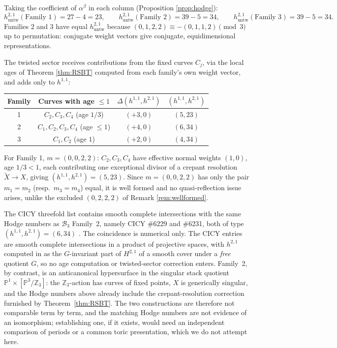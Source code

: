 \documentclass[11pt]{article}
\newcommand{\PP}{\mathbb{P}}
\newcommand{\ZZ}{\mathbb{Z}}
\begin{document}
	Taking the coefficient of $\alpha^\beta$ in each column (Proposition \ref{prop:hodge}):
	\[
	h^{2,1}_{\text{untw}}(\text{Family 1})=27-4=23,\qquad
	h^{2,1}_{\text{untw}}(\text{Family 2})=39-5=34,\qquad
	h^{2,1}_{\text{untw}}(\text{Family 3})=39-5=34.
	\]
	Families 2 and 3 have equal $h^{2,1}_{\text{untw}}$ because $(0,1,2,2)\equiv-(0,1,1,2)\pmod3$ up to permutation: conjugate weight vectors give conjugate, equidimensional representations.
	
	The twisted sector receives contributions from the fixed curves $C_j$, via the local ages of Theorem \ref{thm:RSBT} computed from each family's own weight vector, and adds only to $h^{1,1}$:
	
	\begin{center}
		\begin{tabular}{c|c|c|c}
			Family & Curves with age $\le1$ & $\Delta(h^{1,1},h^{2,1})$ & $(h^{1,1},h^{2,1})$ \\
			\hline
			1 & $C_2,C_3,C_4$ (age $1/3$) & $(+3,0)$ & $(5,23)$ \\
			2 & $C_1,C_2,C_3,C_4$ (age $\le1$) & $(+4,0)$ & $(6,34)$ \\
			3 & $C_1,C_2$ (age $1$) & $(+2,0)$ & $(4,34)$ \\
			\hline
		\end{tabular}
	\end{center}
	
	For Family 1, $m=(0,0,2,2)$: $C_2,C_3,C_4$ have effective normal weights $(1,0)$, age $1/3<1$, each contributing one exceptional divisor of a crepant resolution $\tilde X\to X$, giving $(h^{1,1},h^{2,1})=(5,23)$. Since $m=(0,0,2,2)$ has only the pair $m_1=m_2$ (resp.\ $m_3=m_4$) equal, it is well formed and no quasi-reflection issue arises, unlike the excluded $(0,2,2,2)$ of Remark \ref{rem:wellformed}.
	
	The CICY threefold list \cite{CandelasDale1988,Green1989,Braun2010} contains smooth complete intersections with the same Hodge numbers as $\mathcal B_3$ Family~2, namely CICY \#6229 and \#6231, both of type $(h^{1,1},h^{2,1})=(6,34)$ \cite{ConstantinGrayLukas2016}. The coincidence is numerical only. The CICY entries are smooth complete intersections in a product of projective spaces, with $h^{2,1}$ computed in \cite{ConstantinGrayLukas2016} as the $G$-invariant part of $H^{2,1}$ of a smooth cover under a \emph{free} quotient $G$, so no age computation or twisted-sector correction enters. Family~2, by contrast, is an anticanonical hypersurface in the singular stack quotient $\PP^1\times[\PP^3/\ZZ_3]$: the $\ZZ_3$-action has curves of fixed points, $X$ is generically singular, and the Hodge numbers above already include the crepant-resolution correction furnished by Theorem~\ref{thm:RSBT}. The two constructions are therefore not comparable term by term, and the matching Hodge numbers are not evidence of an isomorphism; establishing one, if it exists, would need an independent comparison of periods or a common toric presentation, which we do not attempt here.
	
\end{document}
